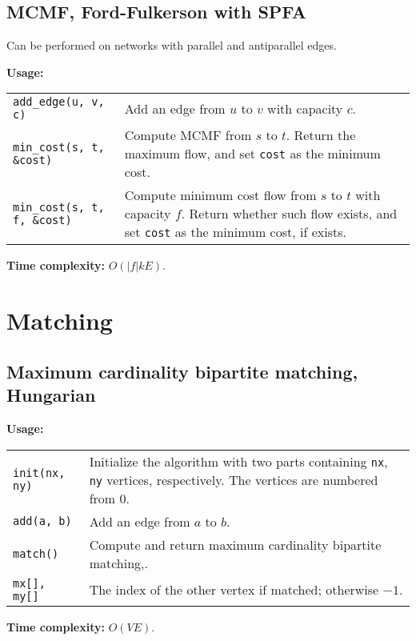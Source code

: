 \subsection{MCMF, Ford-Fulkerson with SPFA}
\Tick Can be performed on networks with parallel and antiparallel edges.\par
\textbf{Usage:} \\[0.1cm]
\begin{tabular}{p{4.5cm} p{7cm}}
  \lstinline|add_edge(u, v, c)| & Add an edge from $u$ to $v$ with capacity $c$. \\
  \lstinline|min_cost(s, t, &cost)| & Compute MCMF from $s$ to $t$. Return the maximum flow, and set \lstinline|cost| as the minimum cost. \\
  \lstinline|min_cost(s, t, f, &cost)| & Compute minimum cost flow from $s$ to $t$ with capacity $f$. Return whether such flow exists, and set \lstinline|cost| as the minimum cost, if exists. \\
\end{tabular} \par
\textbf{Time complexity:} $O(|f|kE)$. \par


\section{Matching}
\subsection{Maximum cardinality bipartite matching, Hungarian}
\textbf{Usage:} \\[0.1cm]
\begin{tabular}{p{2.5cm} p{8cm}}
  \lstinline|init(nx, ny)| & Initialize the algorithm with two parts containing  \lstinline|nx|,  \lstinline|ny| vertices, respectively. The vertices are numbered from 0. \\
  \lstinline|add(a, b)| & Add an edge from $a$ to $b$. \\
  \lstinline|match()| & Compute and return maximum cardinality bipartite matching,. \\
  \lstinline|mx[], my[]| & The index of the other vertex if matched; otherwise $-1$. \\
\end{tabular} \par
\textbf{Time complexity:} $O(VE)$. \par


